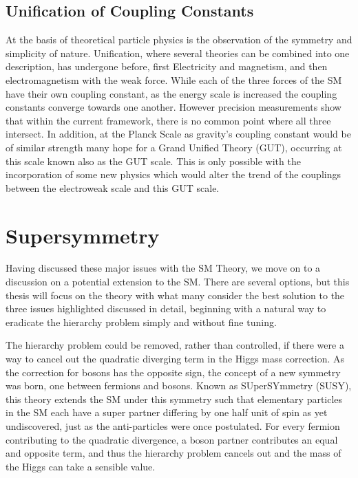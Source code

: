 \subsection{Unification of Coupling Constants}

At the basis of theoretical particle physics is the observation of the symmetry and simplicity of nature. Unification, where several theories can be combined into one description,  has undergone before, first Electricity and magnetism, and then electromagnetism with the weak force. While each of the three forces of the SM have their own coupling constant, as the energy scale is increased the coupling constants converge towards one another. However precision measurements show that within the current framework,  there is no common point where all three intersect. In addition, at the Planck Scale as gravity's coupling constant would be of similar strength many hope for a Grand Unified Theory (GUT),  occurring at this scale known also as the GUT scale. This is only possible with the incorporation of some new physics which would alter the trend of the couplings between the electroweak scale and this GUT scale. 



\section{Supersymmetry}

Having discussed these major issues with the SM Theory, we move on to a discussion on a potential extension to the SM. There are several options, but this thesis will focus on the theory with what many consider the best solution to the three issues highlighted discussed in detail, beginning with a natural way to eradicate the hierarchy problem simply and without fine tuning.

The hierarchy problem could be removed, rather than controlled, if there were a way to cancel out the quadratic diverging term in the Higgs mass correction. As the correction for bosons has the opposite sign, the concept of a new symmetry was born, one between fermions and bosons. Known as SUperSYmmetry (SUSY), this theory extends the SM under this symmetry such that elementary particles in the SM each have a super partner differing by one half unit of spin as yet undiscovered, just as the anti-particles were once postulated. For every fermion contributing to the quadratic divergence, a boson partner contributes an equal and opposite term, and thus the hierarchy problem cancels out and the mass of the Higgs can take a sensible value.

